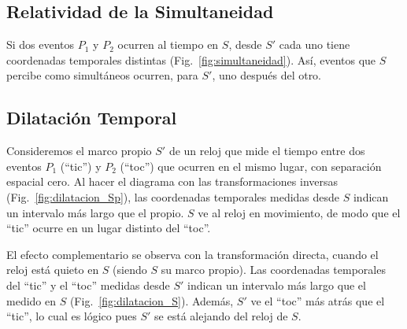 \subsection{Relatividad de la Simultaneidad}

Si dos eventos $P_1$ y $P_2$ ocurren al tiempo en $S$, desde $S'$ cada uno tiene coordenadas temporales distintas (Fig.~\ref{fig:simultaneidad}). Así, eventos que $S$ percibe como simultáneos ocurren, para $S'$, uno después del otro.



\subsection{Dilatación Temporal}

Consideremos el marco propio $S'$ de un reloj que mide el tiempo entre dos eventos $P_1$ (``tic'') y $P_2$ (``toc'') que ocurren en el mismo lugar, con separación espacial cero. Al hacer el diagrama con las transformaciones inversas (Fig.~\ref{fig:dilatacion_Sp}), las coordenadas temporales medidas desde $S$ indican un intervalo más largo que el propio. $S$ ve al reloj en movimiento, de modo que el ``tic'' ocurre en un lugar distinto del ``toc''.



El efecto complementario se observa con la transformación directa, cuando el reloj está quieto en $S$ (siendo $S$ su marco propio). Las coordenadas temporales del ``tic'' y el ``toc'' medidas desde $S'$ indican un intervalo más largo que el medido en $S$ (Fig.~\ref{fig:dilatacion_S}). Además, $S'$ ve el ``toc'' más atrás que el ``tic'', lo cual es lógico pues $S'$ se está alejando del reloj de $S$.


